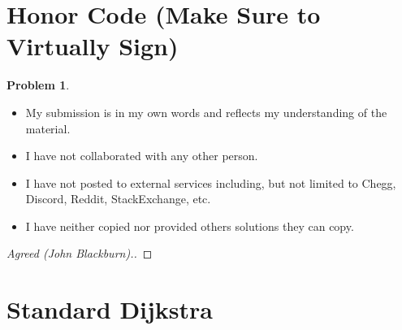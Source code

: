 \documentclass[11pt]{article}
\theoremstyle{definition}
\theoremstyle{definition}
\newtheorem{required}{Problem}
\theoremstyle{definition}
\begin{document}
\section{Honor Code (Make Sure to Virtually Sign)} \label{HonorCode}

\begin{required}
\noindent 
\begin{itemize}
\item My submission is in my own words and reflects my understanding of the material.
\item I have not collaborated with any other person.
\item I have not posted to external services including, but not limited to Chegg, Discord, Reddit, StackExchange, etc.
\item I have neither copied nor provided others solutions they can copy.
\end{itemize}

\end{required}

\begin{proof}[Agreed (John Blackburn).]
\end{proof}



\newpage
\section{Standard Dijkstra}
\end{document}
